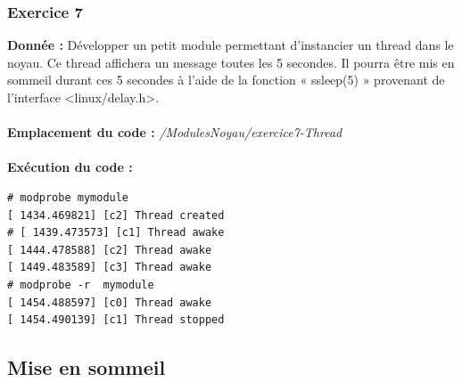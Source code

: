 \subsubsection{Exercice 7}
\textbf{Donnée : }Développer	un	petit	module	permettant	d’instancier	un	thread	dans	le	noyau.	Ce	thread	affichera	un	message	toutes	les	5	secondes.	Il	pourra	être	mis	en	sommeil	durant	ces	5	secondes à	l’aide	de	la	fonction	« ssleep(5) »	provenant	de	l’interface	<linux/delay.h>.\\\\
\textbf{Emplacement du code : } \textit{/ModulesNoyau/exercice7-Thread}\\\\
\textbf{Exécution du code : }
\begin{lstlisting}
# modprobe mymodule                                                             
[ 1434.469821] [c2] Thread created                                              
# [ 1439.473573] [c1] Thread awake                                              
[ 1444.478588] [c2] Thread awake                                                
[ 1449.483589] [c3] Thread awake                                                
# modprobe -r  mymodule                                                         
[ 1454.488597] [c0] Thread awake                                                
[ 1454.490139] [c1] Thread stopped   
\end{lstlisting}
\subsection{Mise en sommeil}
